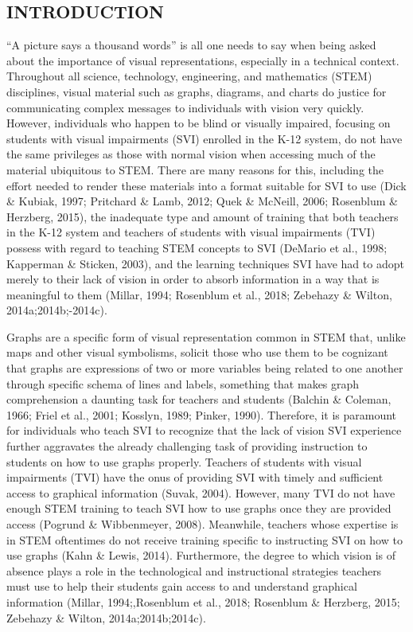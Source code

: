 \documentclass[11.5pt]{sig-alternate} %
\begin{document}
\pagebreak
\clearpage
\begin{large}
    \section*{INTRODUCTION}

“A picture says a thousand words” is all one needs to say when being asked about the importance of visual representations, especially in a technical context. Throughout all science, technology, engineering, and mathematics (STEM) disciplines, visual material such as graphs, diagrams, and charts do justice for communicating complex messages to individuals with vision very quickly. However, individuals who happen to be blind or visually impaired, focusing on students with visual impairments (SVI) enrolled in the K-12 system, do not have the same privileges as those with normal vision when accessing much of the material ubiquitous to STEM. There are many reasons for this, including the effort needed to render these materials into a format suitable for SVI to use (Dick \& Kubiak, 1997; Pritchard \& Lamb, 2012; Quek \& McNeill, 2006; Rosenblum \& Herzberg, 2015), the inadequate type and amount of training that both teachers in the K-12 system and teachers of students with visual impairments (TVI) possess with regard to teaching STEM concepts to SVI (DeMario et al., 1998; Kapperman \& Sticken, 2003), and the learning techniques SVI have had to adopt merely to their lack of vision in order to absorb information in a way that is meaningful to them (Millar, 1994; Rosenblum et al., 2018; Zebehazy \& Wilton, 2014a;2014b;-2014c).

Graphs are a specific form of visual representation common in STEM that, unlike maps and other visual symbolisms, solicit those who use them to be cognizant that graphs are expressions of two or more variables being related to one another through specific schema of lines and labels, something that makes graph comprehension a daunting task for teachers and students (Balchin \& Coleman, 1966; Friel et al., 2001; Kosslyn, 1989; Pinker, 1990). Therefore, it is paramount for individuals who teach SVI to recognize that the lack of vision SVI experience further aggravates the already challenging task of providing instruction to students on how to use graphs properly. Teachers of students with visual impairments (TVI) have the onus of providing SVI with timely and sufficient access to graphical information (Suvak, 2004). However, many TVI do not have enough STEM training to teach SVI how to use graphs once they are provided access (Pogrund \& Wibbenmeyer, 2008). Meanwhile, teachers whose expertise is in STEM oftentimes do not receive training specific to instructing SVI on how to use graphs (Kahn \& Lewis, 2014). Furthermore, the degree to which vision is of absence plays a role in the technological and instructional strategies teachers must use to help their students gain access to and understand graphical information (Millar, 1994;,Rosenblum et al., 2018; Rosenblum \& Herzberg, 2015; Zebehazy \& Wilton, 2014a;2014b;2014c).
 

\end{large}
\end{document}
